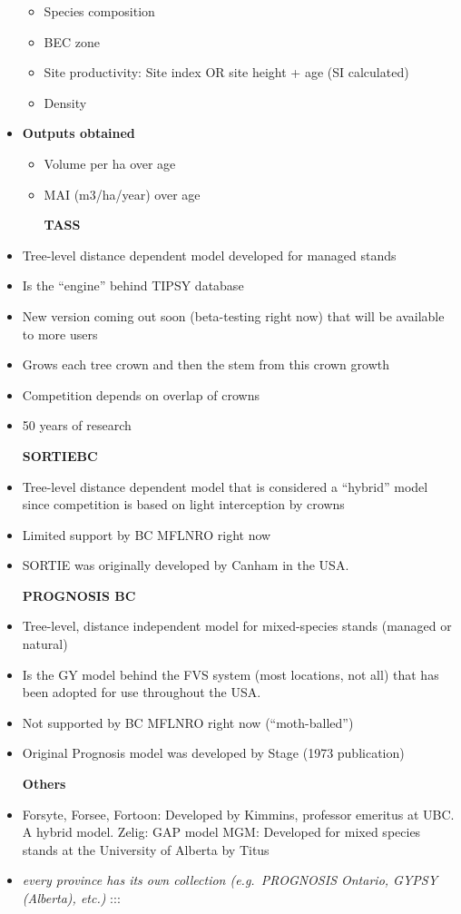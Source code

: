 \documentclass[
  letterpaper,
]{book}
\providecommand{\tightlist}{%
  \setlength{\itemsep}{0pt}\setlength{\parskip}{0pt}}\usepackage{longtable,booktabs,array}
\begin{document}
\begin{itemize}
  \begin{itemize}
  \tightlist
  \item
    Species composition
  \item
    BEC zone
  \item
    Site productivity: Site index OR site height + age (SI calculated)
  \item
    Density
  \end{itemize}
\item
  \textbf{Outputs obtained}

  \begin{itemize}
  \item
    Volume per ha over age
  \item
    MAI (m3/ha/year) over age

    \textbf{TASS}
  \end{itemize}
\item
  Tree-level distance dependent model developed for managed stands
\item
  Is the ``engine'' behind TIPSY database
\item
  New version coming out soon (beta-testing right now) that will be
  available to more users
\item
  Grows each tree crown and then the stem from this crown growth
\item
  Competition depends on overlap of crowns
\item
  50 years of research

  \textbf{SORTIEBC}
\item
  Tree-level distance dependent model that is considered a ``hybrid''
  model since competition is based on light interception by crowns
\item
  Limited support by BC MFLNRO right now
\item
  SORTIE was originally developed by Canham in the USA.

  \textbf{PROGNOSIS BC}
\item
  Tree-level, distance independent model for mixed-species stands
  (managed or natural)
\item
  Is the GY model behind the FVS system (most locations, not all) that
  has been adopted for use throughout the USA.
\item
  Not supported by BC MFLNRO right now (``moth-balled'')
\item
  Original Prognosis model was developed by Stage (1973 publication)

  \textbf{Others}
\item
  Forsyte, Forsee, Fortoon: Developed by Kimmins, professor emeritus at
  UBC. A hybrid model. Zelig: GAP model MGM: Developed for mixed species
  stands at the University of Alberta by Titus
\item
  \emph{every province has its own collection (e.g.~PROGNOSIS Ontario,
  GYPSY (Alberta), etc.)} :::
\end{itemize}
\end{document}
